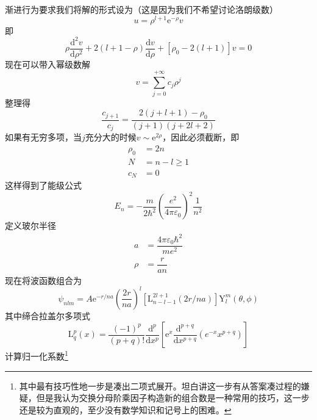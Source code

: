 \documentclass[12pt, a4paper, oneside]{ctexart}
\begin{document}
	\quad\quad 渐进行为要求我们将解的形式设为（这是因为我们不希望讨论洛朗级数）
	\begin{equation}
		u=\rho^{l+1}\mathrm{e}^{-\rho}v
	\end{equation}
	\quad\quad 即
	\begin{equation}
		\rho\dfrac{\mathrm{d}^{2}v}{\mathrm{d}\rho^{2}}+2(l+1-\rho)\dfrac{\mathrm{d}v}{\mathrm{d}\rho}+\left[\rho_{0}-2(l+1)\right]v=0
	\end{equation}
	\quad\quad 现在可以带入幂级数解
	\begin{equation}
		v=\sum_{j=0}^{+\infty}c_{j}\rho^{j}
	\end{equation}
	\quad\quad 整理得
	\begin{equation}
		\dfrac{c_{j+1}}{c_{j}}=\dfrac{2\left(j+l+1\right)-\rho_{0}}{\left(j+1\right)\left(j+2l+2\right)}
	\end{equation}
	\quad\quad 如果有无穷多项，当$j$充分大的时候$v\sim\mathrm{e}^{2\rho}$，因此必须截断，即
	\begin{align}
		\rho_{0}&=2n\\
		N&=n-l\ge1\\
		c_{N}&=0
	\end{align}
	\quad\quad 这样得到了能级公式
	\begin{equation}
		E_{n}=-\dfrac{m}{2\hbar^{2}}\left(\dfrac{e^{2}}{4\pi\varepsilon_{0}}\right)^{2}\dfrac{1}{n^{2}}
	\end{equation}
	\quad\quad 定义玻尔半径
	\begin{align}
		a&=\dfrac{4\pi\varepsilon_{0}\hbar^{2}}{me^{2}}\\
		\rho&=\dfrac{r}{an}
	\end{align}
	\quad\quad 现在将波函数组合为
	\begin{equation}
		\psi_{nlm}=A\mathrm{e}^{-r / n a}\left(\frac{2 r}{n a}\right)^{l}\left[\mathrm{L}_{n-l-1}^{2 l+1}(2 r / n a)\right] \mathrm{Y}_{l}^{m}(\theta, \phi)
	\end{equation}
	\quad\quad 其中缔合拉盖尔多项式
	\begin{equation}
	\mathrm{L}^{p}_{q}(x)=\dfrac{(-1)^{p}}{(p+q)!}\dfrac{\mathrm{d}^{p}}{\mathrm{d}x^{p}}\left[\mathrm{e}^{x}\dfrac{\mathrm{d}^{p+q}}{\mathrm{d}x^{p+q}}\left(e^{-x}x^{p+q}\right)\right]
	\end{equation}
	\quad\quad 计算归一化系数\footnote{其中最有技巧性地一步是凑出二项式展开。坦白讲这一步有从答案凑过程的嫌疑，但是我认为交换分母阶乘因子构造新的组合数是一种常用的技巧，这一步还是较为直观的，至少没有数学知识和记号上的困难。}
\end{document}
